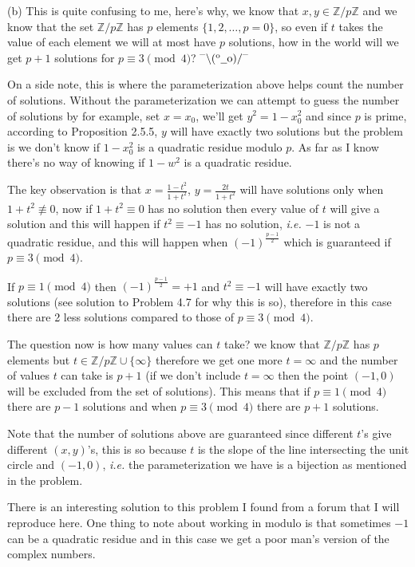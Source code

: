 \documentclass[aps,preprint,preprintnumbers,nofootinbib,showpacs,prd]{revtex4-1}
\newcommand{\ie}{{\it i.e.} }
\newcommand{\dunno}{$ {}^{\mbox {--}}\backslash(^{\rm o}{}\underline{\hspace{0.2cm}}{\rm o})/^{\mbox {--}}$}
\begin{document}
(b) This is quite confusing to me, here's why, we know that $x,y \in \mathbb{Z}/p\mathbb{Z}$ and we know that the set $\mathbb{Z}/p\mathbb{Z}$ has $p$ elements $\{1,2,\dots,p=0\}$, so even if $t$ takes the value of each element we will at most have $p$ solutions, how in the world will we get $p+1$ solutions for $p \equiv 3 \pmod{4}$? \dunno

On a side note, this is where the parameterization above helps count the number of solutions. Without the parameterization we can attempt to guess the number of solutions by for example, set $x = x_0$, we'll get $y^2 = 1 - x_0^2$ and since $p$ is prime, according to Proposition 2.5.5, $y$ will have exactly two solutions but the problem is we don't know if $1 - x_0^2$ is a quadratic residue modulo $p$. As far as I know there's no way of knowing if $1-w^2$ is a quadratic residue.

The key observation is that $x = \frac{1-t^2}{1 + t^2}$,  $y = \frac{2t} {1 + t^2}$ will have solutions only when $1+t^2 \not\equiv 0$, now if $1+t^2 \equiv 0$ has no solution then every value of $t$ will give a solution and this will happen if $t^2 \equiv -1$ has no solution, \ie $-1$ is not a quadratic residue, and this will happen when $(-1)^{\frac{p-1}{2}}$ which is guaranteed if $p \equiv 3 \pmod{4}$.

If $p \equiv 1 \pmod{4}$ then $(-1)^{\frac{p-1}{2}} = +1$ and $t^2 \equiv -1$ will have exactly two solutions (see solution to Problem 4.7 for why this is so), therefore in this case there are 2 less solutions compared to those of $p \equiv 3 \pmod{4}$.

The question now is how many values can $t$ take? we know that $\mathbb{Z}/p\mathbb{Z}$ has $p$ elements but $t \in \mathbb{Z}/p\mathbb{Z}\cup\{\infty\}$ therefore we get one more $t = \infty$ and the number of values $t$ can take is $p+1$ (if we don't include $t=\infty$ then the point $(-1,0)$ will be excluded from the set of solutions). This means that if $p \equiv 1 \pmod{4}$ there are $p-1$ solutions and when $p \equiv 3 \pmod{4}$ there are $p+1$ solutions.

Note that the number of solutions above are guaranteed since different $t$'s give different $(x,y)$'s, this is so because $t$ is the slope of the line intersecting the unit circle and $(-1,0)$, \ie the parameterization we have is a bijection as mentioned in the problem.

There is an interesting solution to this problem I found from a forum that I will reproduce here. One thing to note about working in modulo is that sometimes $-1$ can be a quadratic residue and in this case we get a poor man's version of the complex numbers.
\end{document}
